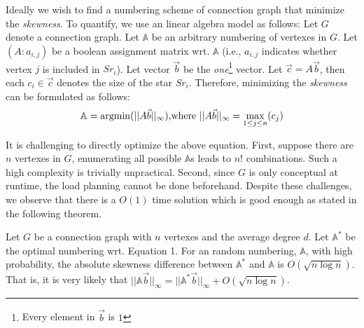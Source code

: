 Ideally we wish to find a numbering scheme of connection graph
that minimize the \emph{skewness}.
To quantify, we use an linear algebra model as follows: 
Let $G$ denote a connection graph.
Let $\mathbb{A}$ be an arbitrary numbering of vertexes in $G$.
Let $(A:a_{i,j})$ be a boolean assignment matrix wrt. $\mathbb{A}$
(i.e., $a_{i,j}$ indicates whether vertex $j$ is included in $Sr_i$). 
Let vector $\vec{b}$ be the \textit{one}\footnote{Every element in $\vec{b}$ is $1$} 
vector. Let $\vec{c} = A\vec{b}$, then each $c_i \in \vec{c}$ 
denotes the size of the star $Sr_i$.
Therefore, minimizing the \emph{skewness} can be formulated as follows:
\begin{equation}
\mathbb{A}  = \operatorname*{argmin}(||A\vec{b}||_\infty) \text{,where } ||A\vec{b}||_\infty = \max_{1\leq j \leq n}(c_j)
\end{equation}

It is challenging to directly optimize the above equation. 
First, suppose there are $n$ vertexes in $G$, enumerating
all possible $\mathbb{A}$s leads to $n!$ combinations. 
Such a high complexity is trivially unpractical. Second,
since $G$ is only conceptual at runtime, 
the load planning cannot be done beforehand. 
Despite these challenges, we observe that there is a 
$O(1)$ time solution which is good enough as stated in the 
following theorem.

\begin{theorem}
Let $G$ be a connection graph with $n$ vertexes and the average degree $d$.
Let $\mathbb{A}^*$ be the optimal numbering wrt. Equation 1.
For an random numbering, $\mathbb{A}$, with high probability, the 
absolute skewness difference between $\mathbb{A}^*$ and $\mathbb{A}$ is $O(\sqrt{n \log n})$.
That is, it is very likely that 
$||\mathbb{A}\vec{b}||_\infty = ||\mathbb{A}^*\vec{b}||_\infty + O(\sqrt{n \log n})$.
\end{theorem}

